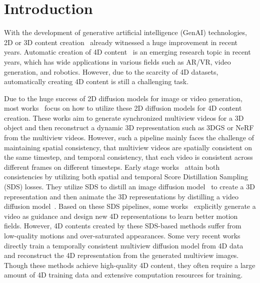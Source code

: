 \section{Introduction}

With the development of generative artificial intelligence (GenAI) technologies, 2D or 3D content creation~\citep{rombach2022latentdiff} already witnessed a huge improvement in recent years. Automatic creation of 4D content~\cite{singer2023text} is an emerging research topic in recent years, which has wide applications in various fields such as AR/VR, video generation, and robotics. However, due to the scarcity of 4D datasets, automatically creating 4D content is still a challenging task.

Due to the huge success of 2D diffusion models for image or video generation, most works~\citep{singer2023text,zhao2023animate124,bahmani20244dfy,zheng2024dreamin4d} focus on how to utilize these 2D diffusion models for 4D content creation. These works aim to generate synchronized multiview videos for a 3D object and then reconstruct a dynamic 3D representation such as 3DGS or NeRF from the multiview videos. However, such a pipeline mainly faces the challenge of maintaining spatial consistency, that multiview videos are spatially consistent on the same timestep, and temporal consistency, that each video is consistent across different frames on different timesteps. Early stage works~\citep{singer2023text,zhao2023animate124,bahmani20244dfy,zheng2024dreamin4d,ling2024alignyourgauss} attain both consistencies by utilizing both spatial and temporal Score Distillation Sampling (SDS) losses. They utilize SDS to distill an image diffusion model~\citep{liu2023zero123,rombach2022latentdiff} to create a 3D representation and then animate the 3D representations by distilling a video diffusion model~\citep{blattmann2023stable}. Based on these SDS pipelines, some works~\citep{jiang2023consistent4d,yin20234dgen,pan2024fastdy4d} explicitly generate a video as guidance and design new 4D representations to learn better motion fields. However, 4D contents created by these SDS-based methods suffer from low-quality motions and over-saturated appearances. Some very recent works~\citep{zhang20244diffusion,liang2024diffusion4d,li2024vividzoo,ren2024l4gm,jiang2024animate3d} directly train a temporally consistent multiview diffusion model from 4D data and reconstruct the 4D representation from the generated multiview images. Though these methods achieve high-quality 4D content, they often require a large amount of 4D training data and extensive computation resources for training.


